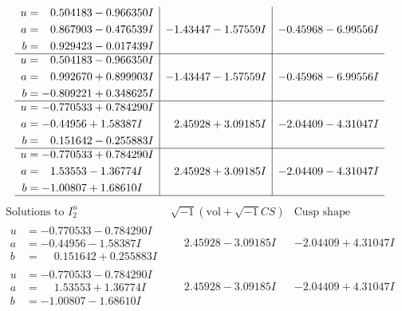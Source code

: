 \documentclass[1p]{elsarticle_modified}
\theoremstyle{definition}
\newcommand{\I}{\sqrt{-1}}
\begin{document}
$$\begin{array}{c|c|c}
\begin{aligned}
u &= \phantom{-}0.504183 - 0.966350 I \\
a &= \phantom{-}0.867903 - 0.476539 I \\
b &= \phantom{-}0.929423 - 0.017439 I\end{aligned}
 & -1.43447 - 1.57559 I & -0.45968 - 6.99556 I \\ \hline\begin{aligned}
u &= \phantom{-}0.504183 - 0.966350 I \\
a &= \phantom{-}0.992670 + 0.899903 I \\
b &= -0.809221 + 0.348625 I\end{aligned}
 & -1.43447 - 1.57559 I & -0.45968 - 6.99556 I \\ \hline\begin{aligned}
u &= -0.770533 + 0.784290 I \\
a &= -0.44956 + 1.58387 I \\
b &= \phantom{-}0.151642 - 0.255883 I\end{aligned}
 & \phantom{-}2.45928 + 3.09185 I & -2.04409 - 4.31047 I \\ \hline\begin{aligned}
u &= -0.770533 + 0.784290 I \\
a &= \phantom{-}1.53553 - 1.36774 I \\
b &= -1.00807 + 1.68610 I\end{aligned}
 & \phantom{-}2.45928 + 3.09185 I & -2.04409 - 4.31047 I\\
 \hline 
 \end{array}$$\newpage$$\begin{array}{c|c|c}  
\text{Solutions to }I^u_{2}& \I (\text{vol} + \sqrt{-1}CS) & \text{Cusp shape}\\
 \hline 
\begin{aligned}
u &= -0.770533 - 0.784290 I \\
a &= -0.44956 - 1.58387 I \\
b &= \phantom{-}0.151642 + 0.255883 I\end{aligned}
 & \phantom{-}2.45928 - 3.09185 I & -2.04409 + 4.31047 I \\ \hline\begin{aligned}
u &= -0.770533 - 0.784290 I \\
a &= \phantom{-}1.53553 + 1.36774 I \\
b &= -1.00807 - 1.68610 I\end{aligned}
 & \phantom{-}2.45928 - 3.09185 I & -2.04409 + 4.31047 I \\ \hline\begin{aligned}

\end{aligned}
\end{array}$$
\end{document}

